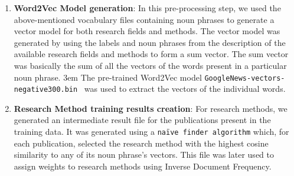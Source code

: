 \documentclass[runningheads]{llncs}
\begin{document}
\begin{enumerate}
		\smallskip
		\item \textbf{Word2Vec Model generation}: In this pre-processing step, we used the above-mentioned vocabulary files containing noun phrases to generate a vector model for both research fields and methods. %
		The vector model was generated by using the labels and noun phrases from the description of the available research fields and methods to form a sum vector. 
		The sum vector was basically the sum of all the vectors of the words present in a particular noun phrase. %
		\emergencystretch 3em {The pre-trained Word2Vec model \texttt{GoogleNews-vectors-negative300.bin}~\cite{DBLP:journals/corr/abs-1301-3781} was used to extract the vectors of the individual words.}
		\smallskip
		\item \textbf{Research Method training results creation}: For research methods, we generated an intermediate %
		result file for the publications present in the training data. %
		It was generated using a \texttt{naïve finder algorithm} which, for each publication, selected the research method with the highest cosine similarity to any of its noun phrase’s vectors. This file was later used to assign weights to research methods using Inverse Document Frequency.
	\end{enumerate}
	
	
	
\end{document}
